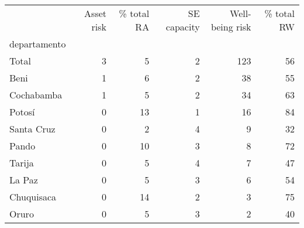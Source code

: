 \begin{tabular}{lrrrrr}
\toprule
{} &  Asset risk &  \% total RA &  SE capacity &  Well-being risk &  \% total RW \\
departamento &             &             &              &                  &             \\
\midrule
Total        &           3 &           5 &            2 &              123 &          56 \\
Beni         &           1 &           6 &            2 &               38 &          55 \\
Cochabamba   &           1 &           5 &            2 &               34 &          63 \\
Potosí       &           0 &          13 &            1 &               16 &          84 \\
Santa Cruz   &           0 &           2 &            4 &                9 &          32 \\
Pando        &           0 &          10 &            3 &                8 &          72 \\
Tarija       &           0 &           5 &            4 &                7 &          47 \\
La Paz       &           0 &           5 &            3 &                6 &          54 \\
Chuquisaca   &           0 &          14 &            2 &                3 &          75 \\
Oruro        &           0 &           5 &            3 &                2 &          40 \\
\bottomrule
\end{tabular}

